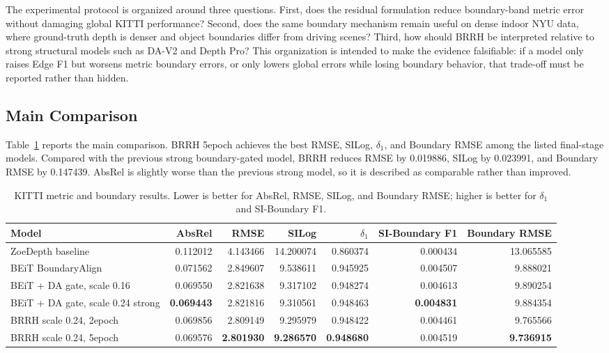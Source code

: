 \documentclass{ieeeaccess}
\begin{document}
The experimental protocol is organized around three questions. First, does the residual formulation reduce boundary-band metric error without damaging global KITTI performance? Second, does the same boundary mechanism remain useful on dense indoor NYU data, where ground-truth depth is denser and object boundaries differ from driving scenes? Third, how should BRRH be interpreted relative to strong structural models such as DA-V2 and Depth Pro? This organization is intended to make the evidence falsifiable: if a model only raises Edge F1 but worsens metric boundary errors, or only lowers global errors while losing boundary behavior, that trade-off must be reported rather than hidden.

\subsection{Main Comparison}

Table~\ref{tab:main-results} reports the main comparison. BRRH 5epoch achieves the best RMSE, SILog, $\delta_1$, and Boundary RMSE among the listed final-stage models. Compared with the previous strong boundary-gated model, BRRH reduces RMSE by 0.019886, SILog by 0.023991, and Boundary RMSE by 0.147439. AbsRel is slightly worse than the previous strong model, so it is described as comparable rather than improved.

\begin{table}[t]
\centering
\small
\caption{KITTI metric and boundary results. Lower is better for AbsRel, RMSE, SILog, and Boundary RMSE; higher is better for $\delta_1$ and SI-Boundary F1.}
\label{tab:main-results}
\begin{tabular}{lrrrrrr}
\toprule
Model & AbsRel & RMSE & SILog & $\delta_1$ & SI-Boundary F1 & Boundary RMSE \\
\midrule
ZoeDepth baseline & 0.112012 & 4.143466 & 14.200074 & 0.860374 & 0.000434 & 13.065585 \\
BEiT BoundaryAlign & 0.071562 & 2.849607 & 9.538611 & 0.945925 & 0.004507 & 9.888021 \\
BEiT + DA gate, scale 0.16 & 0.069550 & 2.821638 & 9.317102 & 0.948274 & 0.004613 & 9.890254 \\
BEiT + DA gate, scale 0.24 strong & \textbf{0.069443} & 2.821816 & 9.310561 & 0.948463 & \textbf{0.004831} & 9.884354 \\
BRRH scale 0.24, 2epoch & 0.069856 & 2.809149 & 9.295979 & 0.948422 & 0.004461 & 9.765566 \\
BRRH scale 0.24, 5epoch & 0.069576 & \textbf{2.801930} & \textbf{9.286570} & \textbf{0.948680} & 0.004519 & \textbf{9.736915} \\
\bottomrule
\end{tabular}
\end{table}
\end{document}
